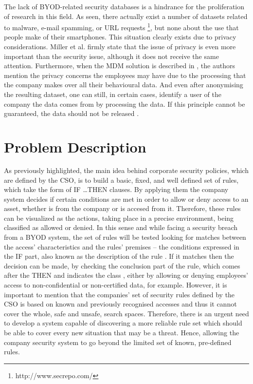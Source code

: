 \documentclass[a4paper,10pt,twocolumn,preprint,3p]{elsarticle}
\begin{document}
The lack of BYOD-related security databases is a hindrance for the
proliferation of research in this field. As seen, there actually exist
a number of datasets related to malware, e-mail spamming, or URL
requests \footnote{http://www.secrepo.com/}, but none about the use
that people make of their smartphones. This situation clearly exists
due to privacy considerations. Miller et al. \cite{Miller201253}
firmly state that the issue of privacy is even more important than the
security issue, although it does not receive the same
attention. Furthermore, when the MDM solution is described in
\cite{ali2015analysis}, the authors mention the privacy concerns the
employees may have due to the processing that the company makes over
all their behavioural data. And even after anonymising the resulting
dataset, one can still, in certain cases, identify a user of the
company the data comes from by processing the data. If this principle
cannot be guaranteed, the data should not be released
\cite{boillat2014handbook}. 

\section{Problem Description}
\label{sec:problem}

As previously highlighted, the main idea behind corporate security
policies, which are defined by the CSO, is to build a basic, fixed,
and well defined set of rules, which take the form of \textsc{IF
  \ldots THEN} clauses. By applying them the company system decides if certain conditions are met in order to allow or
deny access to an asset, whether is from the company or is accesed from it. 
Therefore, these rules can be visualized as the actions, taking place in a precise environment, being classified as
allowed or denied. In this sense and while facing a security breach
from a BYOD system, the set of rules will be tested looking for
matches between the access' characteristics and the rules' premises --
the conditions expressed in the IF part, also known as the description
of the rule \cite{DeFalco2002257}. If it matches then the decision can
be made, by checking the conclusion part of the rule, which comes
after the THEN and indicates the class \cite{DeFalco2002257}, either
by allowing or denying employees' access to non-confidential
 or non-certified data, for example. However, it is important to
 mention that the companies'  set of security rules defined by the CSO is
 based on known and previously recognised accesses and thus it cannot
 cover the whole, safe and unsafe, search spaces. Therefore,
 there is an urgent need to develop a system capable of discovering a
 more reliable rule set which should be able to cover every new
 situation that may be a threat. Hence, allowing the company security
 system to go beyond the limited set of known, pre-defined rules.  %
\end{document}
